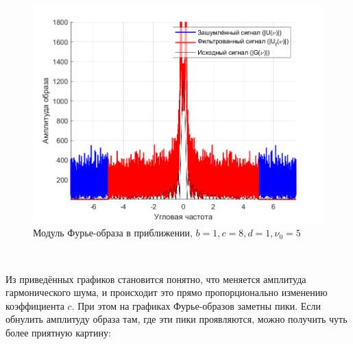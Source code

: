 \documentclass[a4paper]{article}
\begin{document}
\begin{figure}[H]
    \centering
    \includegraphics[width=0.5\linewidth]{part2/1_8_1_Fourier_scaled.png}
    \caption{Модуль Фурье-образа в приближении, $b = 1, c = 8, d = 1, \nu_0 = 5$}
\end{figure}\

Из приведённых графиков становится понятно, что меняется амплитуда гармонического шума, и происходит это прямо пропорционально изменению коэффициента $c$. При этом на графиках Фурье-образов заметны пики. Если обнулить амплитуду образа там, где эти пики проявляются, можно получить чуть более приятную картину:
\end{document}

